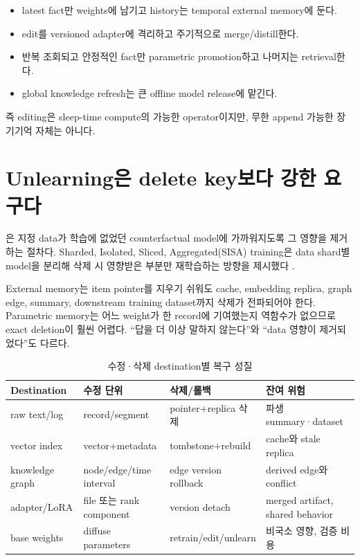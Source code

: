\begin{itemize}
  \item latest fact만 weights에 남기고 history는 temporal external memory에 둔다.
  \item edit를 versioned adapter에 격리하고 주기적으로 merge/distill한다.
  \item 반복 조회되고 안정적인 fact만 parametric promotion하고 나머지는 retrieval한다.
  \item global knowledge refresh는 큰 offline model release에 맡긴다.
\end{itemize}

즉 editing은 sleep-time compute의 가능한 operator이지만, 무한 append 가능한 장기기억 자체는 아니다.

\section{Unlearning은 delete key보다 강한 요구다}

은 지정 data가 학습에 없었던 counterfactual model에 가까워지도록
그 영향을 제거하는 절차다. Sharded, Isolated, Sliced, Aggregated(SISA) training은 data shard별 model을
분리해 삭제 시 영향받은 부분만 재학습하는 방향을 제시했다 \parencite{bourtoule2021unlearning}.

External memory는 item pointer를 지우기 쉬워도 cache, embedding replica, graph edge, summary,
downstream training dataset까지 삭제가 전파되어야 한다. Parametric memory는 어느 weight가 한 record에
기여했는지 역함수가 없으므로 exact deletion이 훨씬 어렵다. ``답을 더 이상 말하지 않는다''와 ``data
영향이 제거되었다''도 다르다.

\begin{table}[htbp]
\centering
\caption{수정·삭제 destination별 복구 성질}
\label{tab:bg-edit-unlearn}
\small
\begin{tabularx}{\textwidth}{p{} X X X}
\toprule
Destination & 수정 단위 & 삭제/롤백 & 잔여 위험 \\
\midrule
raw text/log & record/segment & pointer+replica 삭제 & 파생 summary·dataset \\
vector index & vector+metadata & tombstone+rebuild & cache와 stale replica \\
knowledge graph & node/edge/time interval & edge version rollback & derived edge와 conflict \\
adapter/LoRA & file 또는 rank component & version detach & merged artifact, shared behavior \\
base weights & diffuse parameters & retrain/edit/unlearn & 비국소 영향, 검증 비용 \\
\bottomrule
\end{tabularx}
\end{table}

